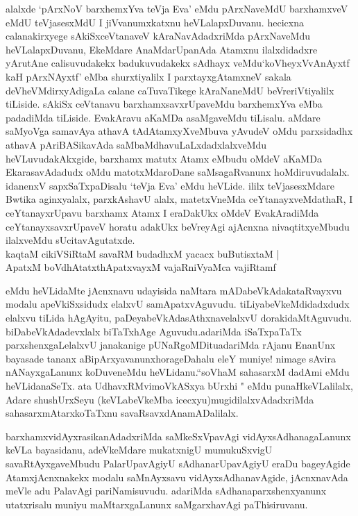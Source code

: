 \begin{artha}
alalxde `pArxNoV barxhemxYva teVja Eva' eMdu pArxNaveMdU barxhamxveV eMdU teVjasesxMdU I jiVvanumxkatxnu heVLalapxDuvanu. hecicxna calanakirxyege sAkiSxceVtanaveV kAraNavAdadxriMda pArxNaveMdu heVLalapxDuvanu, EkeMdare AnaMdarUpanAda Atamxnu ilalxdidadxre yArutAne calisuvudakekx badukuvudakekx sAdhayx veMdu\break `koVheyxVvAnAyxtf kaH pArxNAyxtf' eMba shurxtiyalilx I parxtayxgAtamxneV sakala deVheVMdirxyAdigaLa calane caTuvaTikege kAraNaneMdU beVreriVtiyalilx tiLiside. sAkiSx ceVtanavu barxhamxsavxrUpaveMdu barxhemxYva eMba padadiMda tiLiside. EvakAravu aKaMDa asaMgaveMdu tiLisalu. aMdare saMyoVga samavAya athavA tAdAtamxyXveMbuva yAvudeV oMdu parxsidadhx athavA pAriBASikavAda saMbaMdhavuLaLxdadxlalxveMdu heVLuvudakAkxgide, barxhamx matutx Atamx eMbudu oMdeV aKaMDa EkarasavAdadudx oMdu matotxMdaroDane saMsagaRvanunx hoMdiruvudalalx. idanenxV sapxSaTxpaDisalu `teVja Eva' eMdu heVLide. ililx teVjasesxMdare Bwtika aginxyalalx, parxkAshavU alalx, matetxVneMda ceYtanayxveMdathaR, I ceYtanayxrUpavu barxhamx Atamx I eraDakUkx oMdeV EvakAradiMda ceYtanayxsavxrUpaveV horatu adakUkx beVreyAgi ajAcnxna nivaqtitxyeMbudu ilalxveMdu sUcitavAgutatxde.\\
kaqtaM cikiVSiRtaM savaRM budadhxM yacacx buButisxtaM |\\
ApatxM boVdhAtatxthA\s \s patxvayxM vajaRniVyaMca vajiRtamf 
\end{artha}

\begin{artha}
eMdu heVLidaMte jAcnxnavu udayisida naMtara mADabeVkAdakataRvayxvu modalu apeVkiSxsidudx elalxvU samApatxvAguvudu. tiLiyabeVkeMdidadxdudx elalxvu tiLida hAgAyitu, paDeyabeVkAdasAthxnavelalxvU dorakidaMtAguvudu. biDabeVkAdadevxlalx biTaTxhAge Aguvudu.\break adariMda iSaTxpaTaTx parxshenxgaLelalxvU janakanige pUNaRgoMDitu\break adariMda rAjanu EnanUnx bayasade tananx aBipArxyavanunx\break horageDahalu eleY muniye! nimage sAvira nANayxgaLanunx koDuveneMdu heVLidanu.``soV\s haM sahasarxM dadAmi eMdu heVLidanaSeTx. ata UdhavxRMvimoVkASxya bUrxhi " eMdu punaHkeVLalilalx, Adare shushUrxSeyu (keVLabeVkeMba icecxyu)mugidilalxvAdadxriMda sahasarxmAtarxkoTaTxnu savaRsavxdAnamADalilalx.
\end{artha}

\begin{artha}
barxhamxvidAyxrasikanAdadxriMda saMkeSxVpavAgi vidAyxsAdhanagaLanunx keVLa bayasidanu, adeVkeMdare mukatxnigU mumukuSxvigU savaRtAyxgaveMbudu PalarUpavAgiyU sAdhanarUpavAgiyU eraDu bageyAgide AtamxjAcnxnakekx modalu saMnAyxsavu vidAyxsAdhanavAgide, jAcnxnavAda meVle adu PalavAgi pariNamisuvudu. adariMda sAdhanaparxshenxyanunx utatxrisalu muniyu maMtarxgaLanunx saMgarxhavAgi paThisiruvanu.
\end{artha}


